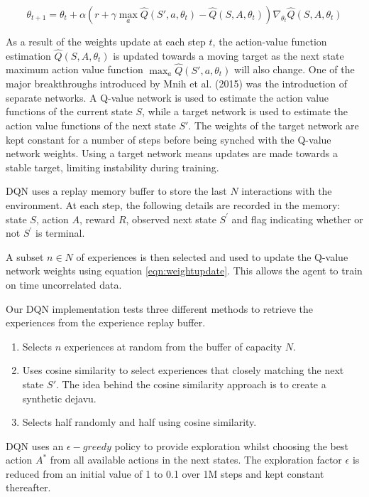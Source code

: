 \documentclass{article}
\begin{document}
\begin{equation}
\label{eqn:weightupdate}
\theta_{t+1} = \theta_{t} + \alpha \left( r + \gamma \max_{a} \hat{Q}(S',a,\theta_{t}) - \hat{Q}(S,A,\theta_{t}) \right) \nabla_{\theta_{t}} \hat{Q}(S,A,\theta_{t})
\end{equation}

As a result of the weights update at each step $t$, the action-value function estimation $\hat{Q}(S, A,\theta_{t})$ is updated towards a moving target as the next state maximum action value function $\max_{a} \hat{Q}(S',a,\theta_{t})$ will also change. One of the major breakthroughs introduced by Mnih et al. (2015) was the introduction of separate networks. A Q-value network is used to estimate the action value functions of the current state $S$, while a target network is used to estimate the action value functions of the next state $S'$. The weights of the target network are kept constant for a number of steps before being synched with the Q-value network weights. Using a target network means updates are made towards a stable target, limiting instability during training.

DQN uses a replay memory buffer to store the last $N$ interactions with the environment. At each step, the following details are recorded in the memory: state $S$, action $A$, reward $R$, observed next state $S^\prime$ and flag indicating whether or not $S^\prime$ is terminal.

A subset $n \in N$ of experiences is then selected and used to update the Q-value network weights using equation \ref{eqn:weightupdate}. This allows the agent to train on time uncorrelated data.

Our DQN implementation tests three different methods to retrieve the experiences from the experience replay buffer.
\begin{enumerate}
  \item Selects $n$ experiences at random from the buffer of capacity $N$.
  \item Uses cosine similarity to select experiences that closely matching the next state $S'$. The idea behind the cosine similarity approach is to create a synthetic dejavu.
  \item Selects half randomly and half using cosine similarity.
\end{enumerate}

DQN uses an $\epsilon-greedy$ policy to provide exploration whilst choosing the best action $A^*$ from all available actions in the next states.
The exploration factor $\epsilon$ is reduced from an initial value of 1 to 0.1 over 1M steps and kept constant thereafter.
\end{document}
